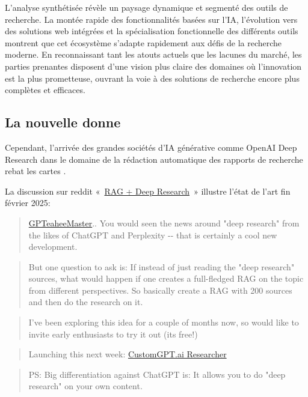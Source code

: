 \documentclass[a4paper,11pt]{report}
\begin{document}
L'analyse synthétisée révèle un paysage dynamique et segmenté des outils de recherche. La montée rapide des fonctionnalités basées sur l'IA, l'évolution vers des solutions web intégrées et la spécialisation fonctionnelle des différents outils montrent que cet écosystème s'adapte rapidement aux défis de la recherche moderne. En reconnaissant tant les atouts actuels que les lacunes du marché, les parties prenantes disposent d'une vision plus claire des domaines où l'innovation est la plus prometteuse, ouvrant la voie à des solutions de recherche encore plus complètes et efficaces.

\subsection{La nouvelle donne}\label{la-nouvelle-donne}

Cependant, l'arrivée des grandes sociétés d'IA générative comme OpenAI Deep Research \citep{Y6A39QJJ} dans le domaine de la rédaction automatique des rapports de recherche rebat les cartes .

La discussion sur reddit «~\href{https://www.reddit.com/r/Rag/comments/1ismm88/rag_deep_research/}{RAG + Deep Research}~» illustre l'état de l'art fin février 2025:

\begin{quote}
\href{https://www.reddit.com/user/GPTeaheeMaster/}{GPTeaheeMaster}.. You would seen the news around "deep research" from the likes of ChatGPT and Perplexity -\/- that is certainly a cool new development.
\end{quote}

\begin{quote}
But one question to ask is: If instead of just reading the "deep research" sources, what would happen if one creates a full-fledged RAG on the topic from different perspectives. So basically create a RAG with 200 sources and then do the research on it.
\end{quote}

\begin{quote}
I've been exploring this idea for a couple of months now, so would like to invite early enthusiasts to try it out (its free!)
\end{quote}

\begin{quote}
Launching this next week: \href{https://researcher.customgpt.ai/}{CustomGPT.ai Researcher}
\end{quote}

\begin{quote}
PS: Big differentiation against ChatGPT is: It allows you to do "deep research" on your own content.
\end{quote}
\end{document}
